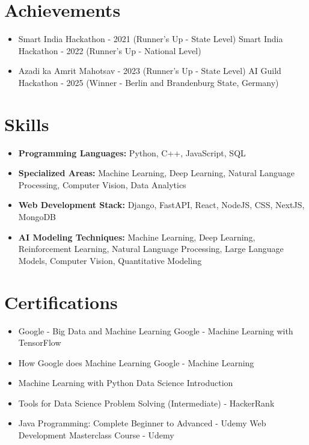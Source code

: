 \documentclass[a4paper,10pt]{article}
\begin{document}
\section*{Achievements}
\begin{itemize}
\item Smart India Hackathon - 2021 (Runner's Up - State Level) \hfill Smart India Hackathon - 2022 (Runner's Up - National Level)
\item Azadi ka Amrit Mahotsav - 2023 (Runner's Up - State Level) \hfill AI Guild Hackathon - 2025 (Winner - Berlin and Brandenburg State, Germany)
\end{itemize}

\section*{Skills}
\begin{itemize}
  \item \textbf{Programming Languages:} Python, C++, JavaScript, SQL
  \item \textbf{Specialized Areas:} Machine Learning, Deep Learning, Natural Language Processing, Computer Vision, Data Analytics
  \item \textbf{Web Development Stack:} Django, FastAPI, React, NodeJS, CSS, NextJS, MongoDB
  \item \textbf{AI Modeling Techniques:} Machine Learning, Deep Learning, Reinforcement Learning, Natural Language Processing, Large Language Models, Computer Vision, Quantitative Modeling
\end{itemize}

\section*{Certifications}
\begin{itemize}
\item Google - Big Data and Machine Learning \hfill Google - Machine Learning with TensorFlow
\item How Google does Machine Learning \hfill Google - Machine Learning
\item Machine Learning with Python \hfill Data Science Introduction
\item Tools for Data Science \hfill Problem Solving (Intermediate) - HackerRank
\item Java Programming: Complete Beginner to Advanced - Udemy \hfill Web Development Masterclass Course - Udemy
\end{itemize}
\end{document}
